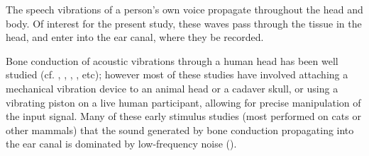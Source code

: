 
The speech vibrations of a person's own voice \DIFdelbegin {}\DIFdelend propagate throughout the head and body.%
Of interest for the present study, these waves \DIFdelbegin {}\DIFdelend pass through the tissue in the head, and enter into the ear canal, where they \DIFdelbegin {}\DIFdelend \DIFaddbegin {}\DIFaddend be recorded. %

Bone conduction of acoustic vibrations through a human head has been well studied (cf. \cite{allen:60}, \cite{hakansson:94}, \cite{stenfelt:00}, \cite{reinfeldt:10}, etc); however most of these studies have involved attaching a mechanical vibration device to an animal head or a cadaver skull, or using a vibrating piston on a live human participant, allowing for precise manipulation of the input signal.  
Many of these early \DIFdelbegin {}\DIFdelend \DIFaddbegin {}\DIFaddend stimulus studies (most performed on cats or other mammals) \DIFdelbegin {}\DIFdelend \DIFaddbegin {}\DIFaddend that the sound generated by bone conduction propagating into the ear canal is dominated by low-frequency noise (\cite{tonndorf:72}).

